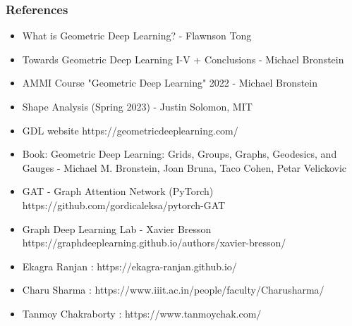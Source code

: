 \begin{frame}[fragile]\frametitle{References}

\begin{itemize}
\item What is Geometric Deep Learning? - Flawnson Tong
\item Towards Geometric Deep Learning I-V + Conclusions - Michael Bronstein
\item AMMI Course "Geometric Deep Learning" 2022 - Michael Bronstein
\item Shape Analysis (Spring 2023) -  Justin Solomon, MIT
\item GDL website https://geometricdeeplearning.com/
\item Book: Geometric Deep Learning: Grids, Groups, Graphs, Geodesics, and Gauges - Michael M. Bronstein, Joan Bruna, Taco Cohen, Petar Velickovic
\item GAT - Graph Attention Network (PyTorch) https://github.com/gordicaleksa/pytorch-GAT
\item Graph Deep Learning Lab - Xavier Bresson https://graphdeeplearning.github.io/authors/xavier-bresson/
\item Ekagra Ranjan : https://ekagra-ranjan.github.io/
\item Charu Sharma : https://www.iiit.ac.in/people/faculty/Charusharma/
\item Tanmoy Chakraborty : https://www.tanmoychak.com/
\end{itemize}
	  
\end{frame}
